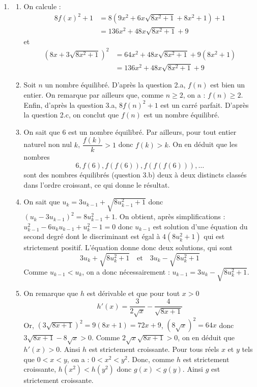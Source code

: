 \begin{enumerate}
\item \textbf{}
\begin{enumerate}
    \item On calcule :
    \begin{align*}
    8f(x)^2 + 1 &= 8\left(9x^2 + 6x\sqrt{8x^2 + 1} + 8x^2 + 1\right) + 1 \\
    &= 136x^2 + 48x\sqrt{8x^2 + 1} + 9
    \end{align*}
    et
    \begin{align*}
    (8x + 3\sqrt{8x^2 + 1})^2 &= 64x^2 + 48x\sqrt{8x^2 + 1} + 9(8x^2 + 1) \\
    &= 136x^2 + 48x\sqrt{8x^2 + 1} + 9
    \end{align*}
    
    \item Soit $n$ un nombre équilibré. D'après la question 2.a, $f(n)$ est bien un entier. On remarque par ailleurs que, comme $n \geq 2$, on a : $f(n) \geq 2$. Enfin, d'après la question 3.a, $8f(n)^2 + 1$ est un carré parfait. D'après la question 2.c, on conclut que $f(n)$ est un nombre équilibré.
    
    \item On sait que 6 est un nombre équilibré. Par ailleurs, pour tout entier naturel non nul $k$, $\dfrac{f(k)}{k} > 1$ donc $f(k) > k$. On en déduit que les nombres
    \[6, f(6), f(f(6)), f(f(f(6))), \ldots\]
    sont des nombres équilibrés (question 3.b) deux à deux distincts classés dans l'ordre croissant, ce qui donne le résultat.
    
    \item On sait que $u_k = 3u_{k-1} + \sqrt{8u_{k-1}^2 + 1}$ donc $(u_k - 3u_{k-1})^2 = 8u_{k-1}^2 + 1$. On obtient, après simplifications : $u_{k-1}^2 - 6u_k u_{k-1} + u_k^2 - 1 = 0$ donc $u_{k-1}$ est solution d'une équation du second degré dont le discriminant est égal à $4(8u_k^2 + 1)$ qui est strictement positif. L'équation donne donc deux solutions, qui sont
    \[3u_k + \sqrt{8u_k^2 + 1} \quad \text{et} \quad 3u_k - \sqrt{8u_k^2 + 1}\]
    Comme $u_{k-1} < u_k$, on a donc nécessairement : $u_{k-1} = 3u_k - \sqrt{8u_k^2 + 1}$.
    
    \item On remarque que $h$ est dérivable et que pour tout $x > 0$
    \[h'(x) = \frac{3}{2\sqrt{x}} - \frac{4}{\sqrt{8x + 1}}\]
    Or, $(3\sqrt{8x + 1})^2 = 9(8x + 1) = 72x + 9$, $(8\sqrt{x})^2 = 64x$ donc $3\sqrt{8x + 1} - 8\sqrt{x} > 0$. Comme $2\sqrt{x}\sqrt{8x + 1} > 0$, on en déduit que $h'(x) > 0$. Ainsi $h$ est strictement croissante. Pour tous réels $x$ et $y$ tels que $0 < x < y$, on a : $0 < x^2 < y^2$. Donc, comme $h$ est strictement croissante, $h(x^2) < h(y^2)$ donc $g(x) < g(y)$. Ainsi $g$ est strictement croissante.
    

\end{enumerate}
\end{enumerate}
